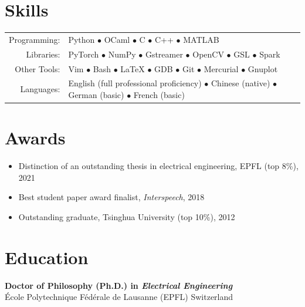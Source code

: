 \documentclass[a4paper,9pt]{extarticle} %
\newcommand{\ind}{\hspace*{1em}}
\begin{document}

\section{Skills}

\begin{tabular}{rl}
  Programming: & Python $\bullet$ OCaml $\bullet$ C $\bullet$ C++ $\bullet$ MATLAB \\
  Libraries: & PyTorch $\bullet$ NumPy $\bullet$ Gstreamer $\bullet$ OpenCV $\bullet$ GSL $\bullet$ Spark \\
  Other Tools: & Vim $\bullet$ Bash $\bullet$ \LaTeX{} $\bullet$ GDB $\bullet$ Git $\bullet$ Mercurial $\bullet$ Gnuplot \\
  Languages: & English (full professional proficiency) $\bullet$ Chinese (native) $\bullet$ German (basic) $\bullet$ French (basic) \\
\end{tabular}


\section{Awards}

\begin{itemize}[itemsep=-.9em]
  \item Distinction of an outstanding thesis in electrical engineering, EPFL (top 8\%), 2021
  \item Best student paper award finalist, \textit{Interspeech}, 2018
  \item Outstanding graduate, Tsinghua University (top 10\%), 2012
\end{itemize}


\section{Education}
\parbox{\textwidth}{%
\textbf{Doctor of Philosophy (Ph.D.) in \textit{Electrical Engineering}} \\
\ind{} \'Ecole Polytechnique F\'ed\'erale de Lausanne (EPFL) \hfill Switzerland
}
\end{document}
